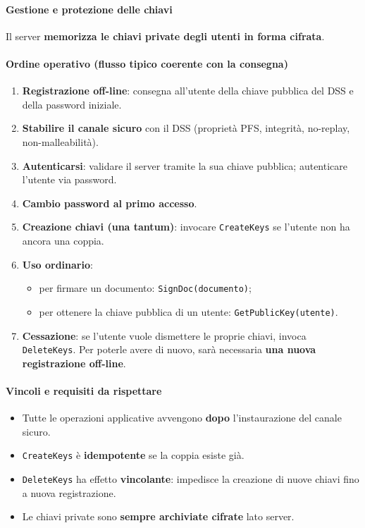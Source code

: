\paragraph{Gestione e protezione delle chiavi}
Il server \textbf{memorizza le chiavi private degli utenti in forma cifrata}. %

\paragraph{Ordine operativo (flusso tipico coerente con la consegna)}
\begin{enumerate}
  \item \textbf{Registrazione off-line}: consegna all'utente della chiave pubblica del DSS e della password iniziale.
  \item \textbf{Stabilire il canale sicuro} con il DSS (proprietà PFS, integrità, no-replay, non-malleabilità).
  \item \textbf{Autenticarsi}: validare il server tramite la sua chiave pubblica; autenticare l'utente via password.
  \item \textbf{Cambio password al primo accesso}.
  \item \textbf{Creazione chiavi (una tantum)}: invocare \texttt{CreateKeys} se l'utente non ha ancora una coppia.
  \item \textbf{Uso ordinario}:
    \begin{itemize}
      \item per firmare un documento: \texttt{SignDoc(documento)};
      \item per ottenere la chiave pubblica di un utente: \texttt{GetPublicKey(utente)}.
    \end{itemize}
  \item \textbf{Cessazione}: se l'utente vuole dismettere le proprie chiavi, invoca \texttt{DeleteKeys}.
        Per poterle avere di nuovo, sarà necessaria \textbf{una nuova registrazione off-line}.
\end{enumerate}

\paragraph{Vincoli e requisiti da rispettare}
\begin{itemize}
  \item Tutte le operazioni applicative avvengono \textbf{dopo} l'instaurazione del canale sicuro.
  \item \texttt{CreateKeys} è \textbf{idempotente} se la coppia esiste già.
  \item \texttt{DeleteKeys} ha effetto \textbf{vincolante}: impedisce la creazione di nuove chiavi fino a nuova registrazione.
  \item Le chiavi private sono \textbf{sempre archiviate cifrate} lato server.
\end{itemize}

